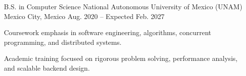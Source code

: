\begin{cventries}

  \cventry
    {B.S. in Computer Science}
    {National Autonomous University of Mexico (UNAM)}
    {Mexico City, Mexico}
    {Aug. 2020 -- Expected Feb. 2027}
    {
      \begin{cvitems}
        \item {Coursework emphasis in software engineering, algorithms, concurrent programming, and distributed systems.}
        \item {Academic training focused on rigorous problem solving, performance analysis, and scalable backend design.}
      \end{cvitems}
    }

\end{cventries}
